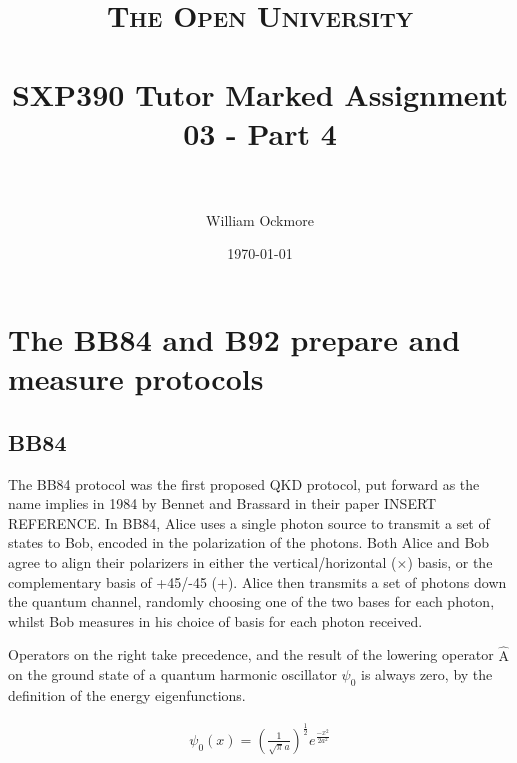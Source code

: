 \documentclass[paper=a4, fontsize=11pt]{scrartcl} %
\title{
\normalfont \normalsize
\textsc{The Open University} \\ [25pt] %
\horrule{0.5pt} \\[0.4cm] %
\huge SXP390 Tutor Marked Assignment 03 - Part 4 \\ %
\horrule{2pt} \\[0.5cm] %
}
\author{William Ockmore} %
\date{\normalsize\today} %
\numberwithin{equation}{section} %
\numberwithin{figure}{section} %
\numberwithin{table}{section} %
\begin{document}
\maketitle %


\section{The BB84 and B92 prepare and measure protocols}

\subsection{BB84}

The BB84 protocol was the first proposed QKD protocol, put forward as the name implies in
1984 by Bennet and Brassard in their paper INSERT REFERENCE. In BB84, Alice uses a single
photon source to transmit a set of states to Bob, encoded in the polarization of the
photons. Both Alice and Bob agree to align their polarizers in either the vertical/horizontal
($\times$) basis, or the complementary basis of +45/-45 ($+$). Alice then transmits
a set of photons down the quantum channel, randomly choosing one of the two bases for each
photon, whilst Bob measures in his choice of basis for each photon received. 


































Operators on the right take precedence, and the result of the lowering operator $\hat{\textrm{A}}$ on the ground state of a quantum harmonic oscillator $\psi_0$ is always zero, by the definition of the energy eigenfunctions.

\begin{align}
\psi_0 (x) =
\left(\frac{1}{\sqrt{\pi}a}\right)^{\frac{1}{2}}
e^{\frac{-x^2}{2a^2}}
\end{align}
\end{document}
